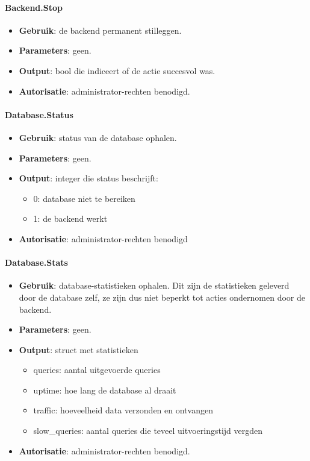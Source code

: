\paragraph{Backend.Stop}
\begin{itemize}
\item{\textbf{Gebruik}: de backend permanent stilleggen.}
\item{\textbf{Parameters}: geen.}
\item{\textbf{Output}: bool die indiceert of de actie succesvol was.}
\item{\textbf{Autorisatie}: administrator-rechten benodigd.}
\end{itemize}

\paragraph{Database.Status}
\begin{itemize}
\item{\textbf{Gebruik}: status van de database ophalen.}
\item{\textbf{Parameters}: geen.}
\item{\textbf{Output}: integer die status beschrijft:}
	\begin{itemize}
	\item{0: database niet te bereiken}
	\item{1: de backend werkt}
	\end{itemize}
\item{\textbf{Autorisatie}: administrator-rechten benodigd}
\end{itemize}

\paragraph{Database.Stats}
\begin{itemize}
\item{\textbf{Gebruik}: database-statistieken ophalen. Dit zijn de statistieken geleverd door de database zelf, ze zijn dus niet beperkt tot acties ondernomen door de backend.}
\item{\textbf{Parameters}: geen.}
\item{\textbf{Output}: struct met statistieken}
	\begin{itemize}
	\item{queries: aantal uitgevoerde queries}
	\item{uptime: hoe lang de database al draait}
	\item{traffic: hoeveelheid data verzonden en ontvangen}
	\item{slow\_queries: aantal queries die teveel uitvoeringstijd vergden}
	\end{itemize}
\item{\textbf{Autorisatie}: administrator-rechten benodigd.}
\end{itemize}

